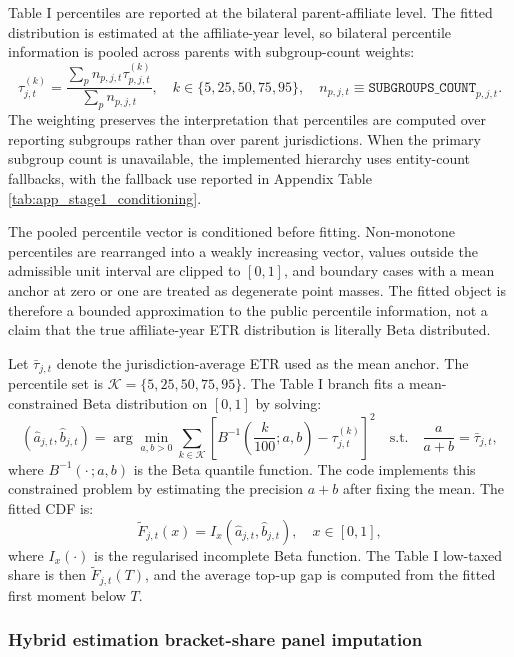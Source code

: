 \documentclass[11pt,a4paper]{article}
\newcommand{\code}[1]{\texttt{#1}}
\begin{document}
Table I percentiles are reported at the bilateral parent-affiliate level. The fitted distribution is estimated at the affiliate-year level, so bilateral percentile information is pooled across parents with subgroup-count weights:
\begin{equation}\label{eq:jurisdiction_percentile}
\tau_{j,t}^{(k)}=\frac{\sum_p n_{p,j,t}\tau_{p,j,t}^{(k)}}{\sum_p n_{p,j,t}},\quad k\in\{5,25,50,75,95\},\quad n_{p,j,t}\equiv\code{SUBGROUPS\_COUNT}_{p,j,t}.
\end{equation}
The weighting preserves the interpretation that percentiles are computed over reporting subgroups rather than over parent jurisdictions. When the primary subgroup count is unavailable, the implemented hierarchy uses entity-count fallbacks, with the fallback use reported in Appendix Table \ref{tab:app_stage1_conditioning}.

The pooled percentile vector is conditioned before fitting. Non-monotone percentiles are rearranged into a weakly increasing vector, values outside the admissible unit interval are clipped to $[0,1]$, and boundary cases with a mean anchor at zero or one are treated as degenerate point masses. The fitted object is therefore a bounded approximation to the public percentile information, not a claim that the true affiliate-year ETR distribution is literally Beta distributed.

Let $\bar{\tau}_{j,t}$ denote the jurisdiction-average ETR used as the mean anchor. The percentile set is $\mathcal{K}=\{5,25,50,75,95\}$. The Table I branch fits a mean-constrained Beta distribution on $[0,1]$ by solving:
\begin{equation}\label{eq:beta_fit}
(\hat{a}_{j,t},\hat{b}_{j,t})
=\arg\min_{a,b>0}
\sum_{k\in\mathcal{K}}
\left[
B^{-1}\!\left(\frac{k}{100};a,b\right)-\tau_{j,t}^{(k)}
\right]^2
\quad
\text{s.t.}\quad
\frac{a}{a+b}=\bar{\tau}_{j,t},
\end{equation}
where $B^{-1}(\cdot\,;a,b)$ is the Beta quantile function. The code implements this constrained problem by estimating the precision $a+b$ after fixing the mean. The fitted CDF is:
\begin{equation}\label{eq:beta_cdf}
\tilde{F}_{j,t}(x)=I_x(\hat{a}_{j,t},\hat{b}_{j,t}),\quad x\in[0,1],
\end{equation}
where $I_x(\cdot)$ is the regularised incomplete Beta function. The Table I low-taxed share is then $\tilde{F}_{j,t}(T)$, and the average top-up gap is computed from the fitted first moment below $T$.

\subsubsection{Hybrid estimation bracket-share panel imputation}\label{sec:bspi}
\end{document}

